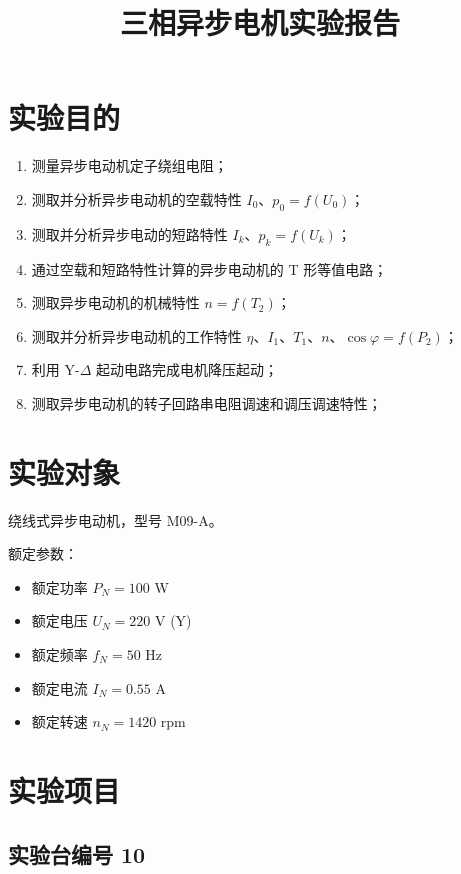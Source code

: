 \documentclass[12pt,a4paper]{article}
\title{三相异步电机实验报告}
\author{}
\date{}
\begin{document}
\maketitle
\newpage
\tableofcontents
\newpage
\section{实验目的}

\begin{enumerate}
    \item 测量异步电动机定子绕组电阻；
    \item 测取并分析异步电动机的空载特性 $I_0$、$p_0 = f(U_0)$；
    \item 测取并分析异步电动的短路特性 $I_k$、$p_k = f(U_k)$；
    \item 通过空载和短路特性计算的异步电动机的 T 形等值电路；
    \item 测取异步电动机的机械特性 $n = f(T_2)$；
    \item 测取并分析异步电动机的工作特性 $\eta$、$I_1$、$T_1$、$n$、$\cos\varphi = f(P_2)$；
    \item 利用 Y-$\Delta$ 起动电路完成电机降压起动；
    \item 测取异步电动机的转子回路串电阻调速和调压调速特性；
\end{enumerate}

\section{实验对象}

绕线式异步电动机，型号 M09-A。

额定参数：

\begin{itemize}
    \item 额定功率 $P_N = 100$ W
    \item 额定电压 $U_N = 220$ V (Y)
    \item 额定频率 $f_N = 50$ Hz
    \item 额定电流 $I_N = 0.55$ A
    \item 额定转速 $n_N = 1420$ rpm
\end{itemize}

\section{实验项目}
\subsection{实验台编号 10}
\end{document}
